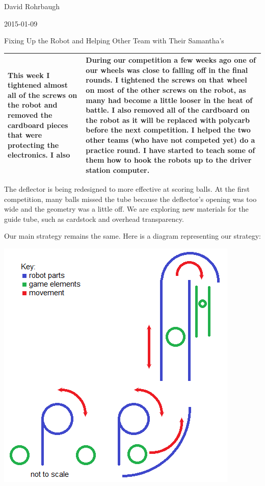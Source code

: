 David Rohrbaugh

2015-01-09

Fixing Up the Robot and Helping Other Team with Their Samantha's

\begin{tabular}{|p{5cm}|p{5cm}|}
 \hline
 This week I tightened almost all of the screws on the robot and removed the cardboard pieces that were protecting the electronics. I also 
 &
 During our competition a few weeks ago one of our wheels was close to falling off in the final rounds. I tightened the screws on that wheel on most of the other screws on the robot, as many had become a little looser in the heat of battle. I also removed all of the cardboard on the robot as it will be replaced with polycarb before the next competition. I helped the two other teams (who have not competed yet) do a practice round. I have started to teach some of them how to hook the robots up to the driver station computer.
 \\
 \hline
\end{tabular}

\medskip

The deflector is being redesigned to more effective at scoring balls. At the first competition, many balls missed the tube because the deflector's opening was too wide and the geometry was a little off. We are exploring new materials for the guide tube, such as cardstock and overhead transparency.

\medskip

Our main strategy remains the same. Here is a diagram representing our strategy:

\begin{center}
 \includegraphics[scale=0.7]{./Entries/Images/scoring_design.png}
\end{center}